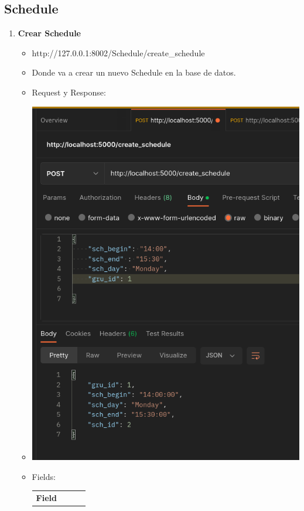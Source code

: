 \documentclass{article}
\begin{document}
\subsection{Schedule}
\begin{enumerate}
    \item \textbf{Crear Schedule}
    \begin{itemize}
        \item http://127.0.0.1:8002/Schedule/create\_schedule
        \item Donde va a crear un nuevo Schedule en la base de datos.
        \item Request y Response:
        \item \includegraphics[scale=.5]{assets/schedule/create.png}
        \item Fields:
        \begin{table}[H] \centering \begin{tabular}{|l|l|l|l|} \hline
        \multicolumn{1}{|c|}{\textbf{Field}} &

\end{tabular}
\end{table}
\end{itemize}
\end{enumerate}
\end{document}
